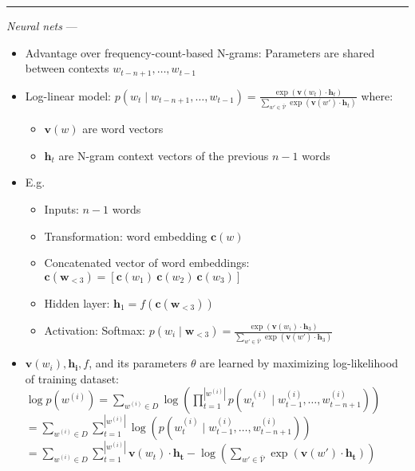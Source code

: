 {\color{lightgray}\hrule height 0.001mm}

\emph{Neural nets} ---
\begin{itemize}
    \item Advantage over frequency-count-based N-grams: Parameters are shared between contexts $w_{t-n+1}, \ldots, w_{t-1}$
    \item Log-linear model:
    $
    p(w_t \mid w_{t-n+1}, \ldots, w_{t-1}) = \frac{\exp(\mathbf{v}(w_t) \cdot \mathbf{h}_t)}{\sum_{w' \in \bar{\mathcal{V}}} \exp(\mathbf{v}(w') \cdot \mathbf{h}_t)}
    $
    where:
    \begin{itemize}
        \item $\mathbf{v}(w)$ are word vectors
        \item $\mathbf{h}_t$ are N-gram context vectors of the previous $n-1$ words
    \end{itemize}
    \item E.g.
    \begin{itemize}
        \item Inputs: $n-1$ words
        \item Transformation: word embedding $\boldsymbol{c}(w)$
        \item Concatenated vector of word embeddings:
        $
        \boldsymbol{c}(\boldsymbol{w}_{<3}) = [\boldsymbol{c}(w_1) \ \boldsymbol{c}(w_2) \ \boldsymbol{c}(w_3)]
        $
        \item Hidden layer:
        $
        \boldsymbol{h}_1 = f(\boldsymbol{c}(\boldsymbol{w}_{<3}))
        $
        \item Activation: Softmax:
        $
        p(w_i \mid \boldsymbol{w}_{<3}) = \frac{\exp \left( \boldsymbol{v}(w_i) \cdot \boldsymbol{h}_3 \right)}{\sum_{w' \in \bar{\mathcal{V}}} \exp \left( \boldsymbol{v}(w') \cdot \boldsymbol{h}_3 \right)}
        $
    \end{itemize}
    \item $\boldsymbol{v}(w_i), \boldsymbol{h_i}, f$, and its parameters $\theta$ are learned by maximizing log-likelihood of training dataset:
    $
    \log p(w^{(i)}) = \sum_{w^{(i)} \in D} \log \left( \prod_{t=1}^{|w^{(i)}|} p(w_t^{(i)} \mid w_{t-1}^{(i)}, \dots, w_{t-n+1}^{(i)}) \right)
    $\\
    $ = \sum_{w^{(i)} \in D} \sum_{t=1}^{|w^{(i)}|} \log \left( p(w_t^{(i)} \mid w_{t-1}^{(i)}, \dots, w_{t-n+1}^{(i)}) \right)$\\
    $ = \sum_{w^{(i)} \in D} \sum_{t=1}^{|w^{(i)}|} \boldsymbol{v}(w_t) \cdot \boldsymbol{h_t} - \log(\sum_{w' \in \bar{\mathcal{V}}} \exp ( \boldsymbol{v}(w') \cdot \boldsymbol{h_t}))$
\end{itemize}

